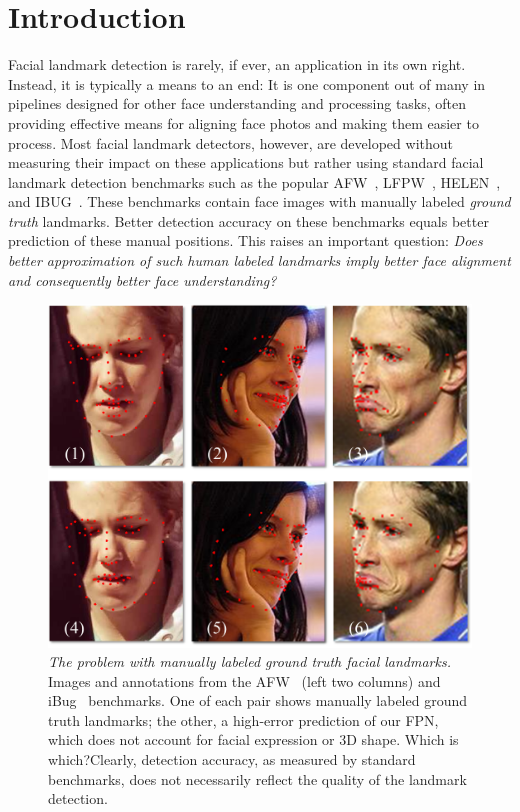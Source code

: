 \documentclass[10pt,twocolumn,letterpaper]{article}
\begin{document}
\section{Introduction}
Facial landmark detection is rarely, if ever, an application in its own right. Instead, it is typically a means to an end: It is one component out of many in pipelines designed for other face understanding and processing tasks, often providing effective means for aligning face photos and making them easier to process. Most facial landmark detectors, however, are developed without measuring their impact on these applications but rather using standard facial landmark detection benchmarks such as the popular AFW~\cite{zhu2012face}, LFPW~\cite{belhumeur2013localizing}, HELEN~\cite{le2012interactive}, and IBUG~\cite{sagonas2013300}. These benchmarks contain face images with manually labeled {\em ground truth} landmarks. Better detection accuracy on these benchmarks equals better prediction of these manual positions. This raises an important question: {\em Does better approximation of such human labeled landmarks imply better face alignment and consequently better face understanding?}

\begin{figure}[t]
\centering
\includegraphics[width=.95\linewidth]{figures/GT_vs_FPN_b.png}
\caption[foo]{
{\em The problem with manually labeled ground truth facial landmarks.} Images and annotations from the AFW~\cite{zhu2012face} (left two columns) and iBug~\cite{sagonas2013300} benchmarks. One of each pair shows  manually labeled ground truth landmarks; the other, a high-error prediction of our FPN, which does not account for facial expression or 3D shape. Which is which?\footnotemark[1] Clearly, detection accuracy, as measured by standard benchmarks, does not necessarily reflect the quality of the landmark detection.}\label{fig:gt_vs_fpn}
\end{figure}
\end{document}
